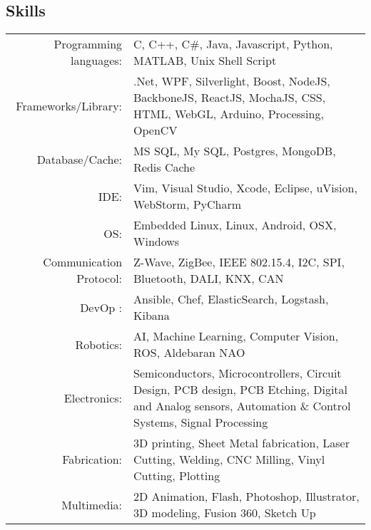 \subsection{Skills}
\begin{tabular}
		{r p{10cm}}
		Programming languages:& C, C++, C\#, Java, Javascript, Python, MATLAB, Unix Shell Script\\
		Frameworks/Library:& .Net, WPF, Silverlight, Boost, NodeJS, BackboneJS, ReactJS, MochaJS, CSS, HTML, WebGL, Arduino, Processing, OpenCV\\
		Database/Cache:& MS SQL, My SQL, Postgres, MongoDB, Redis Cache\\
		IDE:& Vim, Visual Studio, Xcode, Eclipse, uVision, WebStorm, PyCharm\\
		OS:&  Embedded Linux, Linux, Android, OSX, Windows\\
		Communication Protocol:& Z-Wave, ZigBee, IEEE 802.15.4, I2C, SPI, Bluetooth, DALI, KNX, CAN\\
		DevOp :& Ansible, Chef, ElasticSearch, Logstash, Kibana\\
		Robotics:& AI, Machine Learning, Computer Vision, ROS, Aldebaran NAO\\
		Electronics:&Semiconductors, Microcontrollers, Circuit Design, PCB design, PCB Etching, Digital and Analog sensors, Automation \& Control Systems, Signal Processing\\
		Fabrication:&3D printing, Sheet Metal fabrication, Laser Cutting, Welding, CNC Milling, Vinyl Cutting, Plotting\\
		Multimedia:& 2D Animation, Flash, Photoshop, Illustrator, 3D modeling, Fusion 360, Sketch Up
\end{tabular}
